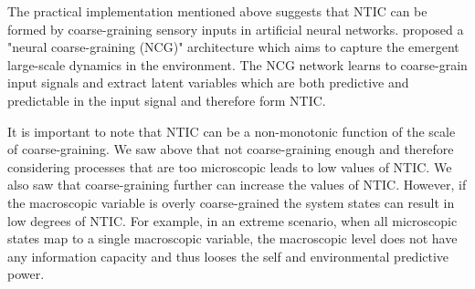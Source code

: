 \documentclass[utf8]{article}
\begin{document}
			
		The practical implementation mentioned above suggests that  NTIC can be formed by coarse-graining sensory inputs in artificial neural networks. \citep{guttenberg2016neural} proposed a "neural coarse-graining (NCG)" architecture which aims to capture the emergent large-scale dynamics in the environment. The NCG network learns to coarse-grain input signals and extract latent variables which are both predictive and predictable in the input signal and therefore form NTIC.

		It is important to note that NTIC can be a non-monotonic function of the scale of coarse-graining. We saw above that not coarse-graining enough and therefore considering processes that are too microscopic leads to low values of NTIC. We also saw that coarse-graining further can increase the values of NTIC. However, if the macroscopic variable is overly coarse-grained the system states can result in low degrees of NTIC. For example, in an extreme scenario, when all microscopic states map to a single macroscopic variable, the macroscopic level does not have any information capacity and thus looses the self and environmental predictive power. 


        





\end{document}

